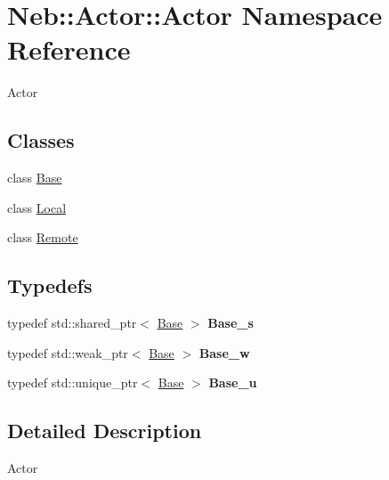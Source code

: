 \hypertarget{namespaceNeb_1_1Actor_1_1Actor}{\section{\-Neb\-:\-:\-Actor\-:\-:\-Actor \-Namespace \-Reference}
\label{namespaceNeb_1_1Actor_1_1Actor}
}


\-Actor  


\subsection*{\-Classes}
\begin{DoxyCompactItemize}
\item 
class \hyperlink{classNeb_1_1Actor_1_1Actor_1_1Base}{\-Base}
\item 
class \hyperlink{classNeb_1_1Actor_1_1Actor_1_1Local}{\-Local}
\item 
class \hyperlink{classNeb_1_1Actor_1_1Actor_1_1Remote}{\-Remote}
\end{DoxyCompactItemize}
\subsection*{\-Typedefs}
\begin{DoxyCompactItemize}
\item 
\hypertarget{namespaceNeb_1_1Actor_1_1Actor_a53b5f755b8288407a883ea0500140431}{typedef std\-::shared\-\_\-ptr$<$ \hyperlink{classNeb_1_1Actor_1_1Actor_1_1Base}{\-Base} $>$ {\bfseries \-Base\-\_\-s}}\label{namespaceNeb_1_1Actor_1_1Actor_a53b5f755b8288407a883ea0500140431}

\item 
\hypertarget{namespaceNeb_1_1Actor_1_1Actor_ac23dcb56f9ccaafd8dbc179e2465e25f}{typedef std\-::weak\-\_\-ptr$<$ \hyperlink{classNeb_1_1Actor_1_1Actor_1_1Base}{\-Base} $>$ {\bfseries \-Base\-\_\-w}}\label{namespaceNeb_1_1Actor_1_1Actor_ac23dcb56f9ccaafd8dbc179e2465e25f}

\item 
\hypertarget{namespaceNeb_1_1Actor_1_1Actor_a9e624fd535d52b994e6f99e5c8a7e34a}{typedef std\-::unique\-\_\-ptr$<$ \hyperlink{classNeb_1_1Actor_1_1Actor_1_1Base}{\-Base} $>$ {\bfseries \-Base\-\_\-u}}\label{namespaceNeb_1_1Actor_1_1Actor_a9e624fd535d52b994e6f99e5c8a7e34a}

\end{DoxyCompactItemize}


\subsection{\-Detailed \-Description}
\-Actor 